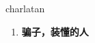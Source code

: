 
\begin{frame}
{\huge charlatan}
\begin{center}
\begin{enumerate}\Large
  \item \textbf{骗子，装懂的人}
\end{enumerate}
\end{center}
\end{frame}
